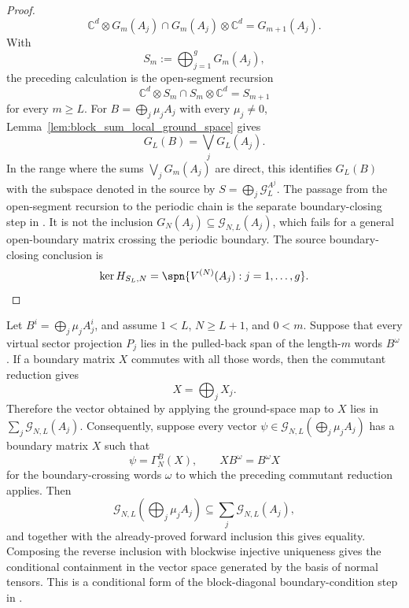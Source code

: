 \begin{proof}
    \[
        \mathbb C^d\otimes G_m(A_j)
        \cap
        G_m(A_j)\otimes\mathbb C^d
        =
        G_{m+1}(A_j).
    \]
    With
    \[
        S_m:=\bigoplus_{j=1}^g G_m(A_j),
    \]
    the preceding calculation is the open-segment recursion
    \[
        \mathbb C^d\otimes S_m
        \cap
        S_m\otimes\mathbb C^d
        =
        S_{m+1}
    \]
    for every $m\ge L$. For $B=\bigoplus_j\mu_j A_j$ with every
    $\mu_j\ne0$, Lemma~\ref{lem:block_sum_local_ground_space} gives
    \[
        G_L(B)=\bigvee_jG_L(A_j).
    \]
    In the range where the sums \(\bigvee_jG_m(A_j)\) are direct, this identifies
    $G_L(B)$ with the subspace denoted in the source by
    $S=\bigoplus_j\mathcal G_L^{A^j}$.
    The passage from the open-segment recursion to the periodic chain is the
    separate boundary-closing step in
    \cite[Theorem~2blocks.2]{PerezGarcia2007Matrix}. It is not the inclusion
    $G_N(A_j)\subseteq\mathcal G_{N,L}(A_j)$, which fails for a general
    open-boundary matrix crossing the periodic boundary. The source
    boundary-closing conclusion is
    \[
        \ker H_{S_L,N}
        =
        \spn\{V^{(N)}(A_j):j=1,\ldots,g\}.
    \]
\end{proof}

\begin{lemma}
    \label{lem:conditional_boundary_matrix_block_split_projection_span}
    \notready
    Let $B^i=\bigoplus_j\mu_j A_j^i$, and assume $1<L$, $N \ge L+1$, and
    $0<m$. Suppose that every virtual sector projection $P_j$ lies in the
    pulled-back span of the length-$m$ words $B^\omega$. If a boundary matrix
    $X$ commutes with all those words, then the commutant reduction gives
    \[
        X=\bigoplus_j X_j.
    \]
    Therefore the vector obtained by applying the ground-space map to $X$ lies in
    $\sum_j \mathcal G_{N,L}(A_j)$. Consequently, suppose every vector
    $\psi\in\mathcal G_{N,L}\!\left(\bigoplus_j\mu_j A_j\right)$ has a
    boundary matrix $X$ such that
    \[
        \psi=\Gamma_N^B(X),
        \qquad
        XB^\omega=B^\omega X
    \]
    for the boundary-crossing words $\omega$ to which the preceding commutant
    reduction applies. Then
    \[
        \mathcal G_{N,L}\!\left(\bigoplus_j\mu_j A_j\right)
        \subseteq \sum_j \mathcal G_{N,L}(A_j),
    \]
    and together with the already-proved forward inclusion this gives equality.
    Composing the reverse inclusion with blockwise injective uniqueness gives
    the conditional containment in the vector space generated by the basis of
    normal tensors.  This is a conditional form of the block-diagonal
    boundary-condition step in \cite[lines~2126--2128]{Cirac2021Matrix}.
\end{lemma}

